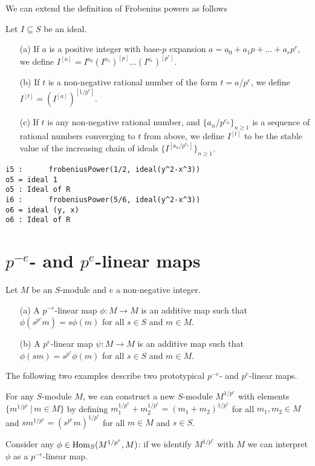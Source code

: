 \documentclass[11pt]{amsart}
\begin{document}
We can extend the definition of Frobenius powers as follows
\begin{definition}
Let  $I\subseteq S$ be an ideal.
\begin{enumerate}
 \item[(a)] If $a$ is a positive integer with base-$p$ expansion  $a=a_0 + a_1 p +  \dots + a_r p^r$, we define
 $I^{[n]}=I^{a_0} \left(I^{a_1}\right)^{[p]} \dots  (I^{a_r})^{[p^r]}$. %
 \item[(b)] If $t$ is a non-negative rational number of the form $t = a/p^e$, we define  $I^{[t]} = (I^{[a]})^{[1/p^e]}.$
 \item[(c)] If $t$ is any non-negative rational number, and $\{a_n/p^{e_n}\}_{n\geq 1}$ is a sequence of rational numbers converging to $t$ from above, we define $I^{[t]}$
 to be the stable value of the increasing chain of ideals $\{I^{[a_n/p^{e_n}]}\}_{n\geq 1}$.

\end{enumerate}
\end{definition}


\begin{verbatim}
i5 :      frobeniusPower(1/2, ideal(y^2-x^3))
o5 = ideal 1
o5 : Ideal of R
i6 :      frobeniusPower(5/6, ideal(y^2-x^3))
o6 = ideal (y, x)
o6 : Ideal of R
\end{verbatim}



\section{$p^{-e}$- and $p^{e}$-linear maps}\label{Section: p-linear maps}

\begin{definition}%
Let  $M$ be an $S$-module and $e$ a non-negative integer.
\begin{enumerate}
 \item[(a)] A $p^{-e}$-linear map $\phi:M \rightarrow M$ is an additive map such that
 $\phi(s^{p^e} m)= s\phi(m)$ for all $s\in S$ and $m\in M$.
 \item[(b)] A $p^{e}$-linear map $\psi:M \rightarrow M$ is an additive map such that
 $\phi(s m)= s^{p^e}\phi(m)$ for all $s\in S$ and $m\in M$.
\end{enumerate}
\end{definition}


The following two examples describe two prototypical
$p^{-e}$- and $p^{e}$-linear maps.
\begin{example}
For any $S$-module $M$, we can construct a new $S$-module $M^{1/p^e}$ with elements $\{  m^{1/p^e} \,|\,m\in M\}$ by defining
$m_1^{1/p^e} +  m_2^{1/p^e} =  (m_1 +  m_2)^{1/p^e}$ for all $m_1, m_2 \in M$ and
$s  m^{1/p^e}=  (s^{p^e} m)^{1/p^e}$ for all $m\in M$ and $s\in S$.

Consider any $\phi\in \operatorname{Hom}_S(M^{1/p^e}, M)$: if we identify $M^{1/p^e}$ with $M$ we can interpret $\phi$ as a $p^{-e}$-linear map.
\end{example}
\end{document}
